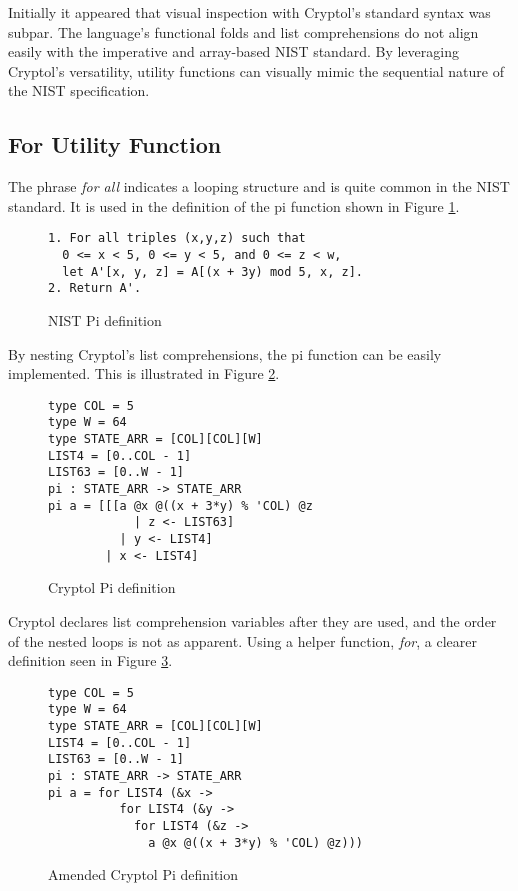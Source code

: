 Initially it appeared that visual inspection with Cryptol's standard syntax was subpar.
The language's functional folds and list comprehensions do not align easily with the imperative and array-based NIST standard. 
By leveraging Cryptol's versatility, utility functions can visually mimic the sequential nature of the NIST specification. 

\subsection{For Utility Function}
The phrase \emph{for all} indicates a looping structure and is quite common in the NIST standard. 
It is used in the definition of the pi function shown in Figure \ref{fig:nistPi}.

\begin{figure}[h]
  \centering
  \begin{lstlisting}[basewidth = {.5em},basicstyle={\scriptsize}]
1. For all triples (x,y,z) such that 
  0 <= x < 5, 0 <= y < 5, and 0 <= z < w,
  let A'[x, y, z] = A[(x + 3y) mod 5, x, z].
2. Return A'.
  \end{lstlisting}
  \caption{NIST Pi definition}
  \label{fig:nistPi}
\end{figure}
    
By nesting Cryptol's list comprehensions, the pi function can be easily implemented.
This is illustrated in Figure \ref{fig:cryptolPi}. 

\begin{figure}[h]
  \centering
\begin{lstlisting}[language=Cryptol]
type COL = 5 
type W = 64
type STATE_ARR = [COL][COL][W]
LIST4 = [0..COL - 1]
LIST63 = [0..W - 1]
pi : STATE_ARR -> STATE_ARR
pi a = [[[a @x @((x + 3*y) % 'COL) @z 
            | z <- LIST63] 
          | y <- LIST4] 
        | x <- LIST4]
\end{lstlisting}
\caption{Cryptol Pi definition}
\label{fig:cryptolPi}
\end{figure}

Cryptol declares list comprehension variables after they are used, and the order of the nested loops is not as apparent. 
Using a helper function, \emph{for}, a clearer definition seen in Figure \ref{fig:cryptolAmendedPi}.

\begin{figure}[h]
  \centering
\begin{lstlisting}[language=Cryptol]
type COL = 5 
type W = 64
type STATE_ARR = [COL][COL][W]
LIST4 = [0..COL - 1]
LIST63 = [0..W - 1]
pi : STATE_ARR -> STATE_ARR
pi a = for LIST4 (&x ->
          for LIST4 (&y -> 
            for LIST4 (&z -> 
              a @x @((x + 3*y) % 'COL) @z)))
\end{lstlisting}
\caption{Amended Cryptol Pi definition}
\label{fig:cryptolAmendedPi}
\end{figure}

